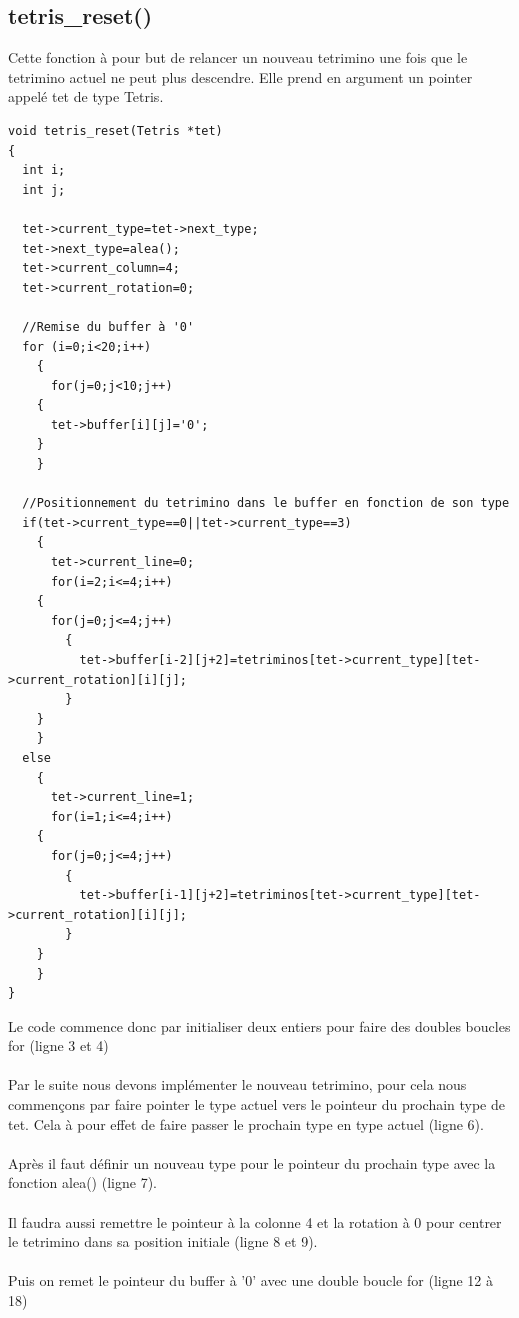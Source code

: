 \documentclass[a4paper,10p]{report}
\begin{document}
\subsection{tetris\_reset()}
\label{tetris_reset}
Cette fonction à pour but de relancer un nouveau tetrimino une fois que le tetrimino actuel ne peut plus descendre. Elle prend en argument un pointer appelé tet de type Tetris.
\begin{lstlisting}
void tetris_reset(Tetris *tet)
{
  int i;
  int j;

  tet->current_type=tet->next_type;
  tet->next_type=alea();
  tet->current_column=4;
  tet->current_rotation=0;

  //Remise du buffer à '0'
  for (i=0;i<20;i++)
    {
      for(j=0;j<10;j++)
	{
	  tet->buffer[i][j]='0';
	}
    }

  //Positionnement du tetrimino dans le buffer en fonction de son type
  if(tet->current_type==0||tet->current_type==3)
    {
      tet->current_line=0;
      for(i=2;i<=4;i++)
	{
	  for(j=0;j<=4;j++)
	    {
	      tet->buffer[i-2][j+2]=tetriminos[tet->current_type][tet->current_rotation][i][j];
	    }
	}
    }
  else
    {
      tet->current_line=1;
      for(i=1;i<=4;i++)
	{
	  for(j=0;j<=4;j++)
	    {
	      tet->buffer[i-1][j+2]=tetriminos[tet->current_type][tet->current_rotation][i][j];
	    }
	}
    }
}
\end{lstlisting}
Le code commence donc par initialiser deux entiers pour faire des doubles boucles for (ligne \textcolor{gris}{3} et \textcolor{gris}{4})
\\\\
Par le suite nous devons implémenter le nouveau tetrimino, pour cela nous commençons par faire pointer le type actuel vers le pointeur du prochain type de tet. Cela à pour effet de faire passer le prochain type en type actuel (ligne \textcolor{gris}{6}).
\\\\
Après il faut définir un nouveau type pour le pointeur du prochain type avec la fonction alea() (ligne \textcolor{gris}{7}).
\\\\
Il faudra aussi remettre le pointeur à la colonne 4 et la rotation à 0 pour centrer le tetrimino dans sa position initiale (ligne \textcolor{gris}{8} et \textcolor{gris}{9}).
\\\\
Puis on remet le pointeur du buffer à '0' avec une double boucle for (ligne \textcolor{gris}{12} à \textcolor{gris}{18})
\\\\
\end{document}
